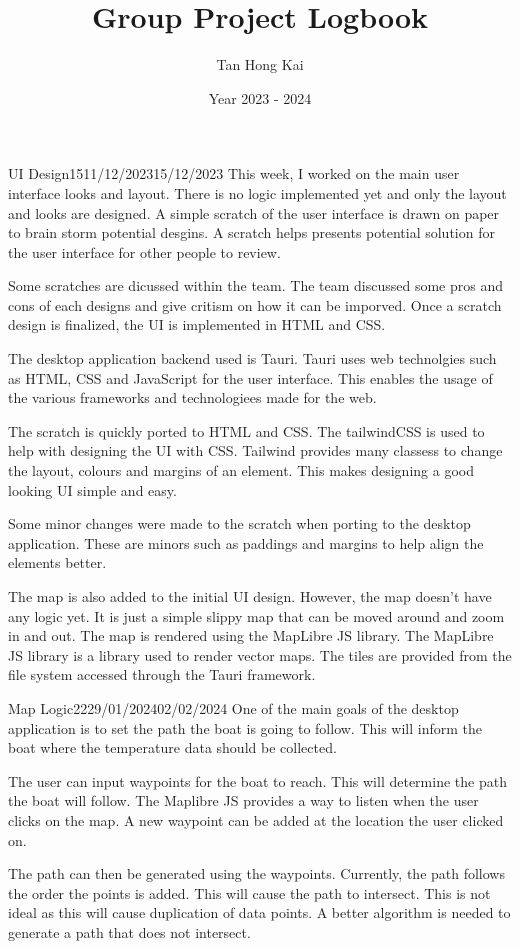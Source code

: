\documentclass[12pt]{article}
\title{Group Project Logbook}
\author{Tan Hong Kai}
\date{Year 2023 - 2024}
\begin{document}
\maketitle

\begin{logbook-entry}{UI Design}{15}{11/12/2023}{15/12/2023}
This week, I worked on the main user interface looks and layout.
There is no logic implemented yet and only the layout and looks are designed.
A simple scratch of the user interface is drawn on paper to brain storm potential desgins.
A scratch helps presents potential solution for the user interface for other people to review.

Some scratches are dicussed within the team.
The team discussed some pros and cons of each designs and give critism on how it can be imporved.
Once a scratch design is finalized, the UI is implemented in HTML and CSS.

The desktop application backend used is Tauri.
Tauri uses web technolgies such as HTML, CSS and JavaScript for the user interface.
This enables the usage of the various frameworks and technologiees made for the web.

The scratch is quickly ported to HTML and CSS.
The tailwindCSS is used to help with designing the UI with CSS.
Tailwind provides many classess to change the layout, colours and margins of an element.
This makes designing a good looking UI simple and easy.

Some minor changes were made to the scratch when porting to the desktop application.
These are minors such as paddings and margins to help align the elements better.

The map is also added to the initial UI design.
However, the map doesn't have any logic yet.
It is just a simple slippy map that can be moved around and zoom in and out.
The map is rendered using the MapLibre JS library.
The MapLibre JS library is a library used to render vector maps.
The tiles are provided from the file system accessed through the Tauri framework.
\end{logbook-entry}

\begin{logbook-entry}{Map Logic}{22}{29/01/2024}{02/02/2024}
One of the main goals of the desktop application is to set the path the boat is going to follow.
This will inform the boat where the temperature data should be collected.

The user can input waypoints for the boat to reach.
This will determine the path the boat will follow.
The Maplibre JS provides a way to listen when the user clicks on the map.
A new waypoint can be added at the location the user clicked on.

The path can then be generated using the waypoints.
Currently, the path follows the order the points is added.
This will cause the path to intersect.
This is not ideal as this will cause duplication of data points.
A better algorithm is needed to generate a path that does not intersect.
\end{logbook-entry}
\end{document}

